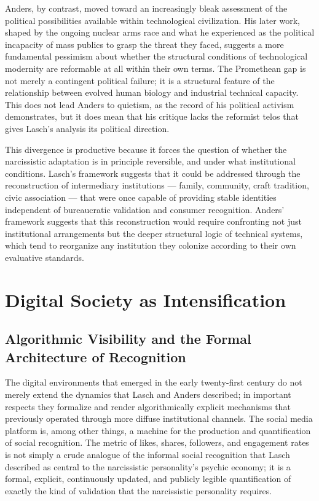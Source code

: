 \documentclass[12pt]{memoir}
\begin{document}
Anders, by contrast, moved toward an increasingly bleak assessment of the political possibilities
available within technological civilization. His later work, shaped by the ongoing nuclear arms
race and what he experienced as the political incapacity of mass publics to grasp the threat
they faced, suggests a more fundamental pessimism about whether the structural conditions of
technological modernity are reformable at all within their own terms. The Promethean gap is
not merely a contingent political failure; it is a structural feature of the relationship between
evolved human biology and industrial technical capacity. This does not lead Anders to quietism,
as the record of his political activism demonstrates, but it does mean that his critique lacks
the reformist telos that gives Lasch's analysis its political direction.

This divergence is productive because it forces the question of whether the narcissistic
adaptation is in principle reversible, and under what institutional conditions. Lasch's
framework suggests that it could be addressed through the reconstruction of intermediary
institutions — family, community, craft tradition, civic association — that were once capable
of providing stable identities independent of bureaucratic validation and consumer recognition.
Anders' framework suggests that this reconstruction would require confronting not just
institutional arrangements but the deeper structural logic of technical systems, which tend
to reorganize any institution they colonize according to their own evaluative standards.

\section{Digital Society as Intensification}
\label{sec:digital}

\subsection{Algorithmic Visibility and the Formal Architecture of Recognition}

The digital environments that emerged in the early twenty-first century do not merely extend
the dynamics that Lasch and Anders described; in important respects they formalize and render
algorithmically explicit mechanisms that previously operated through more diffuse institutional
channels. The social media platform is, among other things, a machine for the production and
quantification of social recognition. The metric of likes, shares, followers, and engagement
rates is not simply a crude analogue of the informal social recognition that Lasch described
as central to the narcissistic personality's psychic economy; it is a formal, explicit,
continuously updated, and publicly legible quantification of exactly the kind of validation
that the narcissistic personality requires.
\end{document}
